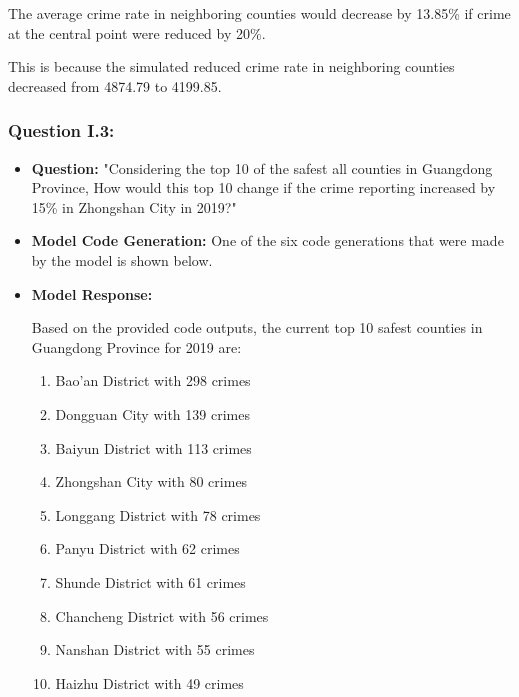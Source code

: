 \begin{itemize}
\begin{itemize}
\begin{tcolorbox}[colback=white!95!black, colframe=black, title=Q2 Response, fontupper=\scriptsize]
    The average crime rate in neighboring counties would decrease by 13.85\% if crime at the central point were reduced by 20\%. 

    This is because the simulated reduced crime rate in neighboring counties decreased from 4874.79 to 4199.85.
    
    \end{tcolorbox}

\end{itemize}
\subsubsection{Question I.3:}
\begin{itemize}
    \item \textbf{Question:} "Considering the top 10 of the safest all counties in Guangdong Province, How would this top 10 change if the crime reporting increased by 15\% in Zhongshan City in 2019?"
    \item \textbf{Model Code Generation:} One of the six code generations that were made by the model is shown below.

    
    
    
    \item \textbf{Model Response:} 
\begin{tcolorbox}[colback=white!95!black, colframe=black, title=Q3 Response, fontupper=\scriptsize]
Based on the provided code outputs, the current top 10 safest counties in Guangdong Province for 2019 are:

\begin{enumerate}
  \item Bao'an District with 298 crimes
  \item Dongguan City with 139 crimes
  \item Baiyun District with 113 crimes
  \item Zhongshan City with 80 crimes
  \item Longgang District with 78 crimes
  \item Panyu District with 62 crimes
  \item Shunde District with 61 crimes
  \item Chancheng District with 56 crimes
  \item Nanshan District with 55 crimes
  \item Haizhu District with 49 crimes
\end{enumerate}


\end{tcolorbox}
\end{itemize}
\end{itemize}
